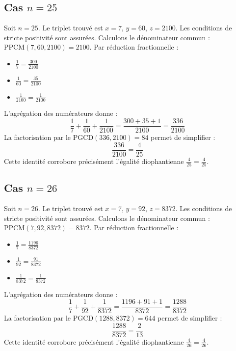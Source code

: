 \documentclass[11pt,a4paper]{article}
\begin{document}
\subsection{Cas $n = 25$}
Soit $n = 25$. Le triplet trouvé est $x = 7$, $y = 60$, $z = 2100$.
Les conditions de stricte positivité sont assurées.
Calculons le dénominateur commun : $\text{PPCM}(7, 60, 2100) = 2100$.
Par réduction fractionnelle :
\begin{itemize}
    \item $\frac{1}{7} = \frac{300}{2100}$
    \item $\frac{1}{60} = \frac{35}{2100}$
    \item $\frac{1}{2100} = \frac{1}{2100}$
\end{itemize}
L'agrégation des numérateurs donne :
$$ \frac{1}{7} + \frac{1}{60} + \frac{1}{2100} = \frac{300 + 35 + 1}{2100} = \frac{336}{2100} $$
La factorisation par le $\text{PGCD}(336, 2100) = 84$ permet de simplifier :
$$ \frac{336}{2100} = \frac{4}{25} $$
Cette identité corrobore précisément l'égalité diophantienne $\frac{4}{25} = \frac{4}{25}$.

\subsection{Cas $n = 26$}
Soit $n = 26$. Le triplet trouvé est $x = 7$, $y = 92$, $z = 8372$.
Les conditions de stricte positivité sont assurées.
Calculons le dénominateur commun : $\text{PPCM}(7, 92, 8372) = 8372$.
Par réduction fractionnelle :
\begin{itemize}
    \item $\frac{1}{7} = \frac{1196}{8372}$
    \item $\frac{1}{92} = \frac{91}{8372}$
    \item $\frac{1}{8372} = \frac{1}{8372}$
\end{itemize}
L'agrégation des numérateurs donne :
$$ \frac{1}{7} + \frac{1}{92} + \frac{1}{8372} = \frac{1196 + 91 + 1}{8372} = \frac{1288}{8372} $$
La factorisation par le $\text{PGCD}(1288, 8372) = 644$ permet de simplifier :
$$ \frac{1288}{8372} = \frac{2}{13} $$
Cette identité corrobore précisément l'égalité diophantienne $\frac{4}{26} = \frac{4}{26}$.
\end{document}
